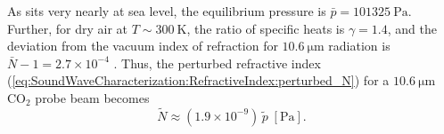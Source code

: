 As \diiid\space sits very nearly at sea level,
the equilibrium pressure is $\bar{p} = \SI{101325}{\pascal}$.
Further, for dry air at $T \sim \SI{300}{\kelvin}$,
the ratio of specific heats is $\gamma = 1.4$, and
the deviation from the vacuum index of refraction
for $\SI{10.6}{\micro\meter}$ radiation is
$\bar{N} - 1 = 2.7 \times 10^{-4}$
\cite{marchetti_ipt06, mathar_N_IR_07, refractive_index_database}.
Thus, the perturbed refractive index
(\ref{eq:SoundWaveCharacterization:RefractiveIndex:perturbed_N})
for a $\SI{10.6}{\micro\meter}$ CO$_2$ probe beam becomes
\begin{equation}
  \tilde{N}
  \approx
  (1.9 \times 10^{-9})
  \,
  \tilde{p} \; [\text{Pa}].
  \label{eq:SoundWaveCharacterization:RefractiveIndex:perturbed_N_units}
\end{equation}




